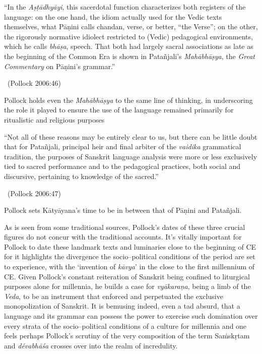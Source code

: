 \begin{myquote}
“In the \textit{Aṣṭādhyāyi}, this sacerdotal function characterizes both registers of the language: on the one hand, the idiom actually used for the Vedic texts themselves, what Pāṇini calls chandan, verse, or better, “the Verse”; on the other, the rigorously normative idiolect restricted to (Vedic) pedagogical environments, which he calls \textit{bhāṣa}, speech. That both had largely sacral associations as late as the beginning of the Common Era is shown in Patañjali’s \textit{Mahābhāṣya}, the \textit{Great Commentary} on Pāṇini’s grammar.” 

~\hfill (Pollock 2006:46)
\end{myquote}

Pollock holds even the \textit{Mahābhāṣya} to the same line of thinking, in underscoring the role it played to ensure the use of the language remained primarily for ritualistic and religious purposes

\begin{myquote}
“Not all of these reasons may be entirely clear to us, but there can be little doubt that for Patañjali, principal heir and final arbiter of the \textit{vaidika} grammatical tradition, the purposes of Sanskrit language analysis were more or less exclusively tied to sacred performance and to the pedagogical practices, both social and discursive, pertaining to knowledge of the sacred.” 

~\hfill (Pollock 2006:47)
\end{myquote}

Pollock sets Kātyāyana’s time to be in between that of Pāṇini and Patañjali.

As is seen from some traditional sources, Pollock’s dates of these three crucial figures do not concur with the traditional accounts. It’s vitally important for Pollock to date these landmark texts and luminaries close to the beginning of CE for it highlights the divergence the socio–political conditions of the period are set to experience, with the ‘invention of \textit{kāvya}’ in the close to the first millennium of CE. Given Pollock’s constant reiteration of Sanskrit being confined to liturgical purposes alone for millennia, he builds a case for \textit{vyākaraṇa}, being a limb of the \textit{Veda}, to be an instrument that enforced and perpetuated the exclusive monopolization of Sanskrit. It is bemusing indeed, even a tad absurd, that a language and its grammar can possess the power to exercise such domination over every strata of the socio–political conditions of a culture for millennia and one feels perhaps Pollock’s scrutiny of the very composition of the term Saṁskṛtam and \textit{dévabhāśa} crosses over into the realm of incredulity.


